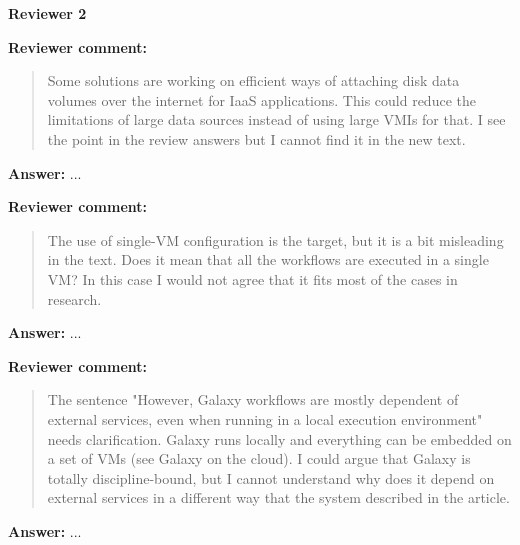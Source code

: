\documentclass{letter}
\newenvironment{review}%
{\textbf{Reviewer comment:}\begin{quote}}%
{\end{quote}}%
\newcommand{\answer}[1]{%
      \textbf{Answer:} #1}
\newcommand{\revised}[1]{\emph{#1}\color{black}}
\begin{document}
\begin{letter}{}
\newpage

%
%
\textbf{Reviewer 2}


\begin{review}
Some solutions are working on efficient ways of attaching disk data volumes over the internet for IaaS applications. This could reduce the limitations of large data sources instead of using large VMIs for that. I see the point in the review answers but I cannot find it in the new text.
\end{review}

\answer{...}

\begin{review}
The use of single-VM configuration is the target, but it is a bit misleading in the text. Does it mean that all the workflows are executed in a single VM? In this case I would not agree that it fits most of the cases in research.
\end{review}

\answer{...}

\begin{review}
The sentence "However, Galaxy workflows are mostly dependent of external services, even when running in a local execution environment" needs clarification. Galaxy runs locally and everything can be embedded on a set of VMs (see Galaxy on the cloud). I could argue that Galaxy is totally discipline-bound, but I cannot understand why does it depend on external services in a different way that the system described in the article.
\end{review}

\answer{...}

\revised{}




\end{letter}
\end{document}
